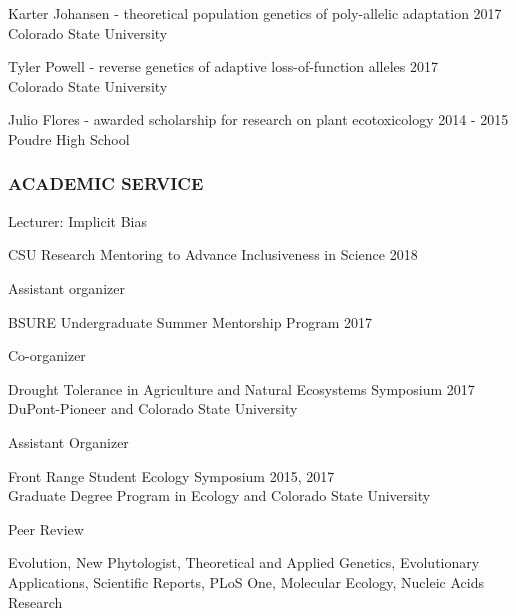 \documentclass[12pt,english]{article}
\begin{document}
\hspace*{1.0em} Karter Johansen -  theoretical population genetics of poly-allelic adaptation
\hfill
2017\\
\hspace*{2.0em} Colorado State University

\hspace*{1.0em} Tyler Powell - reverse genetics of adaptive loss-of-function alleles
\hfill
2017\\
\hspace*{2.0em} Colorado State University

\hspace*{1.0em} Julio Flores - awarded scholarship for research on plant ecotoxicology
\hfill
2014 - 2015\\
\hspace*{2.0em} Poudre High School

\subsubsection*{ACADEMIC SERVICE}
\vspace{-0.5ex}\par

\hspace*{1.0em} Lecturer: Implicit Bias
\par
\hspace*{2.0em} CSU Research Mentoring to Advance Inclusiveness in Science
\hfill
2018

\hspace*{1.0em} Assistant organizer
\par
\hspace*{2.0em} BSURE Undergraduate Summer Mentorship Program
\hfill
2017

\hspace*{1.0em} Co-organizer
\par
\hspace*{2.0em} Drought Tolerance in Agriculture and Natural Ecosystems Symposium
\hfill
2017
\hspace*{2.0em} DuPont-Pioneer and Colorado State University
\par
\vspace{0.5em}
\hspace*{1.0em} Assistant Organizer
\par
\hspace*{2.0em} Front Range Student Ecology Symposium
\hfill
2015, 2017\\
\hspace*{2.0em} Graduate Degree Program in Ecology and Colorado State University
\par
\hspace*{1.0em} Peer Review
\par
\hspace*{2.0em} Evolution, New Phytologist, Theoretical and Applied Genetics, Evolutionary Applications, Scientific Reports, PLoS One, Molecular Ecology, Nucleic Acids Research
\end{document}
